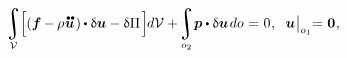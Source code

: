 \nopagebreak\vspace{-0.2em}\begin{equation}\label{lineartheory:principleofvirtualwork}
\displaystyle\integral\displaylimits_{\mathcal{V}} \hspace{-0.2ex} \Bigl[ \left( \bm{f} \hspace{-0.1ex} - \hspace{-0.1ex} \rho \hspace{.1ex} \mathdotdotabove{\bm{u}} \hspace{.2ex} \right) \hspace{-0.1ex} \dotp \variation{\bm{u}} - \variation{\potential} \hspace{.25ex} \Bigr] \hspace{-0.2ex} d\mathcal{V}
+ \hspace{-0.3ex}
\displaystyle\integral\displaylimits_{o_2} \hspace{-0.4ex} \bm{p} \dotp \variation{\bm{u}} \hspace{.25ex} do \hspace{.1ex}
= \hspace{.1ex} 0
\hspace{.1ex} ,
\hspace{.6em}
%
\bm{u} \hspace{.1ex} \bigr|_{o_1} \hspace{-0.64ex} = \hspace{.1ex} \bm{0}
\hspace{.1ex} ,
\vspace{-0.2em}\end{equation}

\noindent\vspace{-0.2em}

